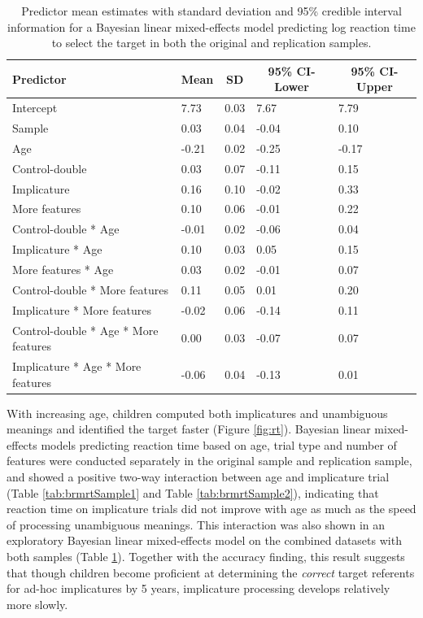 \documentclass[mask,man]{apa6}
\begin{document}
\begin{table}[tbp]
\begin{center}
\begin{threeparttable}
\caption{\label{tab:brmrt}Predictor mean estimates with standard deviation and 95\% credible interval information for a Bayesian linear mixed-effects model predicting log reaction time to select the target in both the original and replication samples.}
\begin{tabular}{lllll}
\toprule
Predictor & \multicolumn{1}{c}{Mean} & \multicolumn{1}{c}{SD} & \multicolumn{1}{c}{95\% CI-Lower} & \multicolumn{1}{c}{95\% CI-Upper}\\
\midrule
Intercept & 7.73 & 0.03 & 7.67 & 7.79\\
Sample & 0.03 & 0.04 & -0.04 & 0.10\\
Age & -0.21 & 0.02 & -0.25 & -0.17\\
Control-double & 0.03 & 0.07 & -0.11 & 0.15\\
Implicature & 0.16 & 0.10 & -0.02 & 0.33\\
More features & 0.10 & 0.06 & -0.01 & 0.22\\
Control-double * Age & -0.01 & 0.02 & -0.06 & 0.04\\
Implicature * Age & 0.10 & 0.03 & 0.05 & 0.15\\
More features * Age & 0.03 & 0.02 & -0.01 & 0.07\\
Control-double * More features & 0.11 & 0.05 & 0.01 & 0.20\\
Implicature * More features & -0.02 & 0.06 & -0.14 & 0.11\\
Control-double * Age * More features & 0.00 & 0.03 & -0.07 & 0.07\\
Implicature * Age * More features & -0.06 & 0.04 & -0.13 & 0.01\\
\bottomrule
\end{tabular}
\end{threeparttable}
\end{center}
\end{table}

With increasing age, children computed both implicatures and unambiguous
meanings and identified the target faster (Figure \ref{fig:rt}).
Bayesian linear mixed-effects models predicting reaction time based on
age, trial type and number of features were conducted separately in the
original sample and replication sample, and showed a positive two-way
interaction between age and implicature trial (Table
\ref{tab:brmrtSample1} and Table \ref{tab:brmrtSample2}), indicating
that reaction time on implicature trials did not improve with age as
much as the speed of processing unambiguous meanings. This interaction
was also shown in an exploratory Bayesian linear mixed-effects model on
the combined datasets with both samples (Table \ref{tab:brmrt}).
Together with the accuracy finding, this result suggests that though
children become proficient at determining the \emph{correct} target
referents for ad-hoc implicatures by 5 years, implicature processing
develops relatively more slowly.
\end{document}
